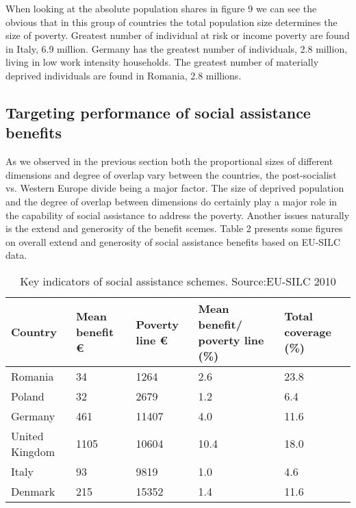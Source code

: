 \documentclass[11pt, a4paper]{article}\usepackage{graphicx, color}
\begin{document}
When looking at the absolute population shares in figure 9 we can see the obvious that in this group of countries the total population size determines the size of poverty. Greatest number of individual at risk or income poverty are found in Italy, 6.9 million. Germany has the greatest number of individuals, 2.8 million, living in low work intensity households. The greatest number of materially deprived individuals are found in Romania, 2.8 millions.

\subsection{Targeting performance of social assistance benefits}

As we observed in the previous section both the proportional sizes of different dimensions and degree of overlap vary between the countries, the post-socialist vs. Western Europe divide being a major factor. The size of deprived population and the degree of overlap between dimensions do certainly play a major role in the capability of social assistance to address the poverty. Another issues naturally is the extend and generosity of the benefit scemes. Table 2 presents some figures on overall extend and generosity of social assistance benefits based on EU-SILC data.

\begin{table}[H]
\begin{center}
\caption{Key indicators of social assistance schemes. Source:EU-SILC 2010}
{\footnotesize
\begin{tabular}{p{2.5cm}p{2.5cm}p{2.5cm}p{3cm}p{3cm}}
  \toprule
  \textbf{Country} & \textbf{Mean benefit \euro} & 
  \textbf{Poverty line \euro} & \textbf{Mean benefit/ poverty line (\%)} &
  \textbf{Total coverage (\%)} \\ \midrule
  Romania & 34 & 1264 & 2.6 & 23.8\\
  Poland & 32 & 2679 & 1.2 & 6.4\\
  Germany & 461 & 11407 & 4.0 & 11.6\\
  United Kingdom & 1105 & 10604 & 10.4 & 18.0\\
  Italy & 93 &  9819 & 1.0 & 4.6\\
  Denmark & 215 & 15352 & 1.4 & 11.6\\
 \bottomrule
 \end{tabular}
}
\end{center}
\end{table}
\end{document}
